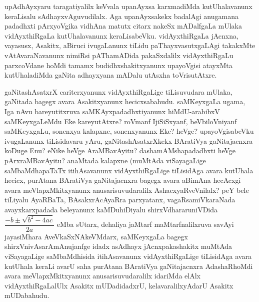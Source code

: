 upAdhAyxyaru taragatiyalilx keVvala upanAyxsa karxmadiMda kutUhalavanunx keraLisalu sAdhayxvAguvudilalx. Aga upanAyxsakekx badalAgi anugamana padadhxti pArxyoVgika vidhAna matutx citarx nakeSx mADalfgaLa mUlaka vidAyxthiRgaLa kutUhalavanunx keraLisabeVku. vidAyxthiRgaLa jAcnxna, vayasusx, Asakitx, aBiruci ivugaLanunx tiLidu paThayxvasutxgaLAgi takakxMte vAtAvaraNavanunx nimiRsi pAThamADida pakaSxdalilx vidAyxthiRgaLu parxcoVdane hoMdi tamamx budidhxshakitxyanunx upayoVgisi atayxMta kutUhaladiMda gaNita adhayxyana mADalu utAsxha toVrisutAtxre.

gaNitashAsatxrX cariterxyanunx vidAyxthiRgaLige tiLisuvudara mUlaka, gaNitada bagegx avara Asakitxyanunx hecicxsabahudu. saMKeyxgaLa ugama, Iga nAvu bareyutitxruva saMKAyxpadadhxtiyanunx hiMdU-arabibxV saMKeyxgaLeMdu Eke kareyutAtxre? roVmanf IjiSiSxyanf, beVbiloVniyanf saMKeyxgaLu, sonenxya kalapxne, sonenxyanunx Eke? heVge? upayoVgisabeVku ivugaLanunx tiLisidavaru yAru, gaNitashAsatxrXkekx BAratiVya gaNitajacnxra koDuge Enu? eNike heVge AraMBavAyitu? dashamAMshapadadhxti heVge pArxraMBavAyitu? anaMtada kalapxne (muMtAda viSayagaLige saMbaMdhapaTaTx itihAsavanunx vidAyxthiRgaLige tiLisidAga avara kutUhala hecicx, purAtana BAratiVya gaNitajacnxra bagegx avara aBimAna hecAcxgi avara meVlapxMkitxyanunx anusarisuvudaralilx AshacxyaRveVnilalx? peY bele tiLiyalu AyaRBaTa, BAsakxrAcAyaRra parxyatanx, vagaRsamiVkaraNada avayxkarxpadada beleyanunx kaMDuhiDiyalu shirxVdhararuniVDida $\dfrac{-b \pm \sqrt{b^2-4ac}}{2a}$ eMba sUtarx, dehaliya jaMtarf maMtarfnalilxruva savAyi jayasiMhara AveVkaSxNAkeVMdarx, saMKeyxgaLa bagegx shirxVnivAsarAmAnujanfge idadx asAdhayx jAcnxpakashakitx muMtAda viSayagaLige saMbaMdhisida itihAsavanunx vidAyxthiRgaLige tiLisidAga avara kutUhala keraLi avarU saha purAtana BAratiVya gaNitajacnxra AdashaRhoMdi avara meVlapxMkitxyanunx anusarisuvudaralilx idariMda elAlx vidAyxthiRgaLalUlx Asakitx mUDadidadxrU, kelavaralilxyAdarU Asakitx mUDabahudu.

